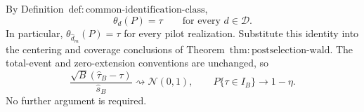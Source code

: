 By Definition~\(\mathrm{def{:}common\text{-}identification\text{-}class}\),
\[
 \theta_d(P)=\tau
 \qquad\text{for every }d\in\mathcal D.
\]
In particular, \(\theta_{\widehat d_m}(P)=\tau\) for every pilot realization. Substitute this identity into the centering and coverage conclusions of Theorem~\(\mathrm{thm{:}postselection\text{-}wald}\). The total-event and zero-extension conventions are unchanged, so
\[
 \frac{\sqrt B(\widehat\tau_B-\tau)}{\widehat s_B}
 \rightsquigarrow\mathcal N(0,1),
 \qquad
 P\{\tau\in I_B\}\longrightarrow1-\eta.
\]
No further argument is required.
